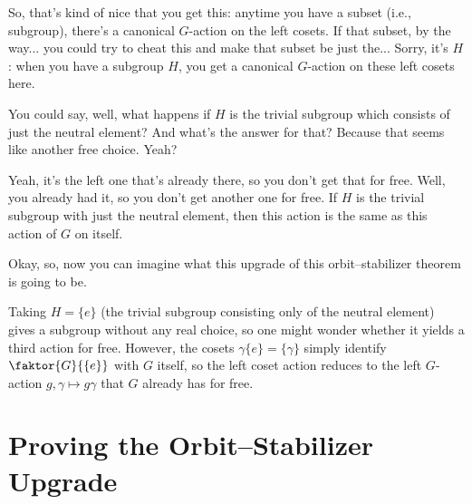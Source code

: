\begin{speech}[00:12:56 - 00:14:10]
So, that's kind of nice that you get this: anytime you have a subset (i.e., subgroup), there's a canonical $G$-action on the left cosets. If that subset, by the way... you could try to cheat this and make that subset be just the... Sorry, it's $H$: when you have a subgroup $H$, you get a canonical $G$-action on these left cosets here.

You could say, well, what happens if $H$ is the trivial subgroup which consists of just the neutral element? And what's the answer for that? Because that seems like another free choice. Yeah? 

Yeah, it's the left one that's already there, so you don't get that for free. Well, you already had it, so you don't get another one for free. If $H$ is the trivial subgroup with just the neutral element, then this action is the same as this action of $G$ on itself.

Okay, so, now you can imagine what this upgrade of this orbit--stabilizer theorem is going to be.
\end{speech}

\begin{insight}
Taking $H = \{e\}$ (the trivial subgroup consisting only of the neutral element) gives a subgroup  without any real choice, so one might wonder whether it yields a third action for free. However, the cosets $\gamma \{e\} = \{\gamma\}$ simply identify $\faktor{G}{\{e\}}$ with $G$ itself, so the left coset action reduces to the left $G$-action $g, \gamma \mapsto g\gamma$ that $G$ already has for free.
\end{insight}

\section{Proving the Orbit--Stabilizer Upgrade}

